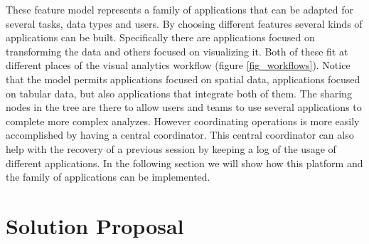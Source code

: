 These feature model represents a family of applications that can be adapted for several tasks, data types and users. By choosing different features several kinds of applications can be built. Specifically there are applications focused on transforming the data and others focused on visualizing it. Both of these fit at different places of the visual analytics workflow (figure \ref{fig_workflows}). Notice that the model permits applications focused on spatial data, applications focused on tabular data, but also applications that integrate both of them. The sharing nodes in the tree are there to allow users and teams to use several applications to complete more complex analyzes. However coordinating operations is more easily accomplished by having a central coordinator. This central coordinator can also help with the recovery of a previous session by keeping a log of the usage of different applications. In the following section we will show how this platform and the family of applications can be implemented.







\section{Solution Proposal}

